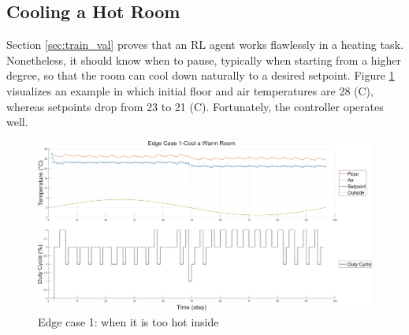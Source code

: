 \documentclass[../main.tex]{subfiles}
\begin{document}

\subsection{Cooling a Hot Room}
Section \ref{sec:train_val} proves that an RL agent works flawlessly in a heating task. Nonetheless, it should know when to pause, typically when starting from a higher degree, so that the room can cool down naturally to a desired setpoint. Figure \ref{fig:edge_1} visualizes an example in which initial floor and air temperatures are 28 (\degree C), whereas setpoints drop from 23 to 21 (\degree C). Fortunately, the controller operates well. 
\begin{figure}[htbp]
    \centering
    \includegraphics[width=1\linewidth]{figures/EdgeCase1-CoolaWarmRoom.png}
    \caption{Edge case 1: when it is too hot inside}
    \label{fig:edge_1}
\end{figure}
\end{document}
